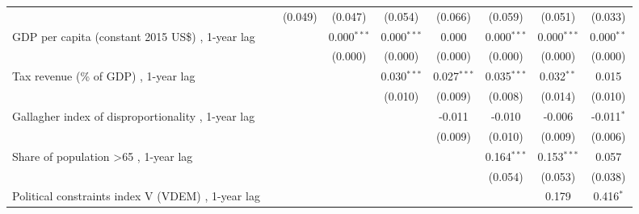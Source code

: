 \begin{table}[htbp]
\begin{tabular}{lcccccccc}
                                                                                                   &                & (0.049)      & (0.047)       & (0.054)       & (0.066)       & (0.059)       & (0.051)       & (0.033)\\   
      GDP per capita (constant 2015 US\$) , 1-year lag                                             &                &              & 0.000$^{***}$ & 0.000$^{***}$ & 0.000         & 0.000$^{***}$ & 0.000$^{***}$ & 0.000$^{**}$\\   
                                                                                                   &                &              & (0.000)       & (0.000)       & (0.000)       & (0.000)       & (0.000)       & (0.000)\\   
      Tax revenue (\% of GDP) , 1-year lag                                                         &                &              &               & 0.030$^{***}$ & 0.027$^{***}$ & 0.035$^{***}$ & 0.032$^{**}$  & 0.015\\   
                                                                                                   &                &              &               & (0.010)       & (0.009)       & (0.008)       & (0.014)       & (0.010)\\   
      Gallagher index of disproportionality , 1-year lag                                           &                &              &               &               & -0.011        & -0.010        & -0.006        & -0.011$^{*}$\\   
                                                                                                   &                &              &               &               & (0.009)       & (0.010)       & (0.009)       & (0.006)\\   
      Share of population >65 , 1-year lag                                                         &                &              &               &               &               & 0.164$^{***}$ & 0.153$^{***}$ & 0.057\\   
                                                                                                   &                &              &               &               &               & (0.054)       & (0.053)       & (0.038)\\   
      Political constraints index V (VDEM) , 1-year lag                                            &                &              &               &               &               &               & 0.179         & 0.416$^{*}$\\   

\end{tabular}
\end{table}
